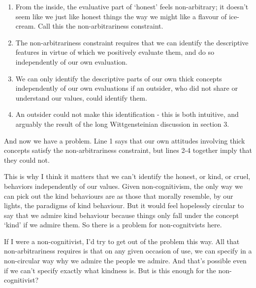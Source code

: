 \documentclass[
]{article}
\providecommand{\tightlist}{%
  \setlength{\itemsep}{0pt}\setlength{\parskip}{0pt}}
\begin{document}
\begin{enumerate}
\def\labelenumi{\arabic{enumi}.}
\tightlist
\item
  From the inside, the evaluative part of `honest' feels non-arbitrary;
  it doesn't seem like we just like honest things the way we might like
  a flavour of ice-cream. Call this the non-arbitrariness constraint.
\item
  The non-arbitrariness constraint requires that we can identify the
  descriptive features in virtue of which we positively evaluate them,
  and do so independently of our own evaluation.
\item
  We can only identify the descriptive parts of our own thick concepts
  independently of our own evaluations if an outsider, who did not share
  or understand our values, could identify them.
\item
  An outsider could not make this identification - this is both
  intuitive, and arguably the result of the long Wittgensteinian
  discussion in section 3.
\end{enumerate}

And now we have a problem. Line 1 says that our own attitudes involving
thick concepts satisfy the non-arbitrariness constraint, but lines 2-4
together imply that they could not.

This is why I think it matters that we can't identify the honest, or
kind, or cruel, behaviors independently of our values. Given
non-cognitivism, the only way we can pick out the kind behaviours are as
those that morally resemble, by our lights, the paradigms of kind
behaviour. But it would feel hopelessly circular to say that we admire
kind behaviour because things only fall under the concept `kind' if we
admire them. So there is a problem for non-cognitvists here.

If I were a non-cognitivist, I'd try to get out of the problem this way.
All that non-arbitrariness requires is that on any given occasion of
use, we can specify in a non-circular way why we admire the people we
admire. And that's possible even if we can't specify exactly what
kindness is. But is this enough for the non-cognitivist?
\end{document}
